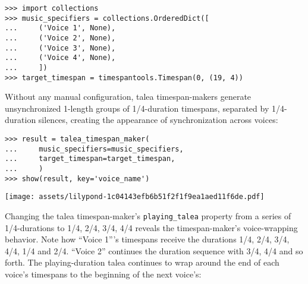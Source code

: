 \begin{abjadbookoutput}
\begin{singlespacing}
\vspace{-0.5\baselineskip}
\begin{verbatim}
>>> import collections
>>> music_specifiers = collections.OrderedDict([
...     ('Voice 1', None),
...     ('Voice 2', None),
...     ('Voice 3', None),
...     ('Voice 4', None),
...     ])
>>> target_timespan = timespantools.Timespan(0, (19, 4))
\end{verbatim}
\end{singlespacing}
\end{abjadbookoutput}

\noindent Without any manual configuration, talea timespan-makers generate
unsynchronized 1-length groups of 1/4-duration timespans, separated by
1/4-duration silences, creating the appearance of synchronization across
voices:

\begin{comment}
<abjad>
result = talea_timespan_maker(
    music_specifiers=music_specifiers,
    target_timespan=target_timespan,
    )
show(result, key='voice_name')
</abjad>
\end{comment}

\begin{abjadbookoutput}
\begin{singlespacing}
\vspace{-0.5\baselineskip}
\begin{verbatim}
>>> result = talea_timespan_maker(
...     music_specifiers=music_specifiers,
...     target_timespan=target_timespan,
...     )
>>> show(result, key='voice_name')
\end{verbatim}
\noindent\texttt{[image: assets/lilypond-1c04143efb6b51f2f1f9ea1aed11f6de.pdf]}
\end{singlespacing}
\end{abjadbookoutput}

\noindent Changing the talea timespan-maker's \texttt{playing\_talea} property
from a series of 1/4-durations to 1/4, 2/4, 3/4, 4/4 reveals the
timespan-maker's voice-wrapping behavior. Note how \enquote{Voice 1}'s
timespans receive the durations 1/4, 2/4, 3/4, 4/4, 1/4 and 2/4. \enquote{Voice
2} continues the duration sequence with 3/4, 4/4 and so forth. The
playing-duration talea continues to wrap around the end of each voice's
timespans to the beginning of the next voice's:

\begin{comment}
<abjad>
talea_timespan_maker = new(
    talea_timespan_maker,
    playing_talea=rhythmmakertools.Talea(
        counts=(1, 2, 3, 4),
        denominator=4,
        )
    )
result = talea_timespan_maker(
    music_specifiers=music_specifiers,
    target_timespan=target_timespan,
    )
show(result, key='voice_name')
</abjad>
\end{comment}

